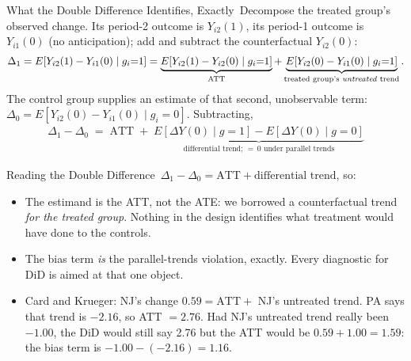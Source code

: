 \documentclass[aspectratio=169,11pt,xcolor=dvipsnames]{beamer}
\newcommand{\E}{E}
\newcommand{\core}{\,\raisebox{0.6pt}{\textcolor{corestar}{$\bigstar$}}}
\begin{document}
\begin{frame}{What the Double Difference Identifies, Exactly\core}
Decompose the treated group's observed change. Its period-2 outcome is
$Y_{i2}(1)$, its period-1 outcome is $Y_{i1}(0)$ (no anticipation); add and
subtract the counterfactual $Y_{i2}(0)$:
\begin{align*}
  \Delta_1 = \E[Y_{i2}(1) - Y_{i1}(0)\mid g_i{=}1]
  = \underbrace{\E[Y_{i2}(1) - Y_{i2}(0)\mid g_i{=}1]}_{\text{ATT}}
  + \underbrace{\E[Y_{i2}(0) - Y_{i1}(0)\mid g_i{=}1]}_{\text{treated group's \emph{untreated} trend}} .
\end{align*}
The control group supplies an estimate of that second, unobservable term:
$\Delta_0 = \E[Y_{i2}(0) - Y_{i1}(0)\mid g_i{=}0]$. Subtracting,
\begin{align*}
  \boxed{\;\Delta_1 - \Delta_0 \;=\; \text{ATT}
  \;+\; \underbrace{\E[\Delta Y(0)\mid g{=}1] - \E[\Delta Y(0)\mid g{=}0]}_{\text{differential trend; } =\,0 \text{ under parallel trends}}\;}
\end{align*}
\end{frame}

\begin{frame}{Reading the Double Difference\core}
$\Delta_1 - \Delta_0 = \text{ATT} + \text{differential trend}$, so:
\vskip4pt
\begin{itemize}\itemsep6pt
  \item The estimand is the \alert{ATT}, not the ATE: we borrowed a
        counterfactual trend \emph{for the treated group}. Nothing in the design
        identifies what treatment would have done to the controls.
  \item The bias term \emph{is} the parallel-trends violation, exactly. Every
        diagnostic for DiD is aimed at that one object.
  \item Card and Krueger: NJ's change $0.59 = \text{ATT} +$ NJ's untreated trend. PA says
        that trend is $-2.16$, so ATT $= 2.76$. Had NJ's untreated trend really been
        $-1.00$, the DiD would still say 2.76 but the ATT would be $0.59 + 1.00 = 1.59$:
        the bias term is $-1.00 - (-2.16) = 1.16$.
\end{itemize}
\end{frame}
\end{document}
